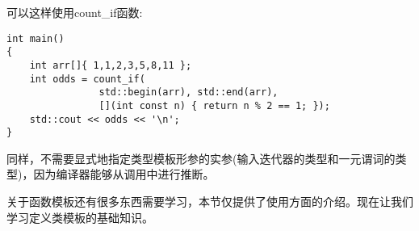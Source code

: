 可以这样使用count\_if函数:

\begin{lstlisting}[style=styleCXX]
int main()
{
	int arr[]{ 1,1,2,3,5,8,11 };
	int odds = count_if(
				std::begin(arr), std::end(arr),
				[](int const n) { return n % 2 == 1; });
	std::cout << odds << '\n';
}
\end{lstlisting}

同样，不需要显式地指定类型模板形参的实参(输入迭代器的类型和一元谓词的类型)，因为编译器能够从调用中进行推断。

关于函数模板还有很多东西需要学习，本节仅提供了使用方面的介绍。现在让我们学习定义类模板的基础知识。



















